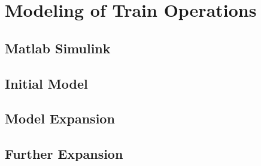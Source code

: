 \section{Modeling of Train Operations}
\label{sec:ModelingOfTrainOperations}

\subsection{Matlab Simulink}
\label{sec:MatlabSimulink}

\subsection{Initial Model}
\label{sec:InitialModel}

\subsection{Model Expansion}
\label{sec:ModelExpansion}

\subsection{Further Expansion}
\label{sec:FurtherExpansion}